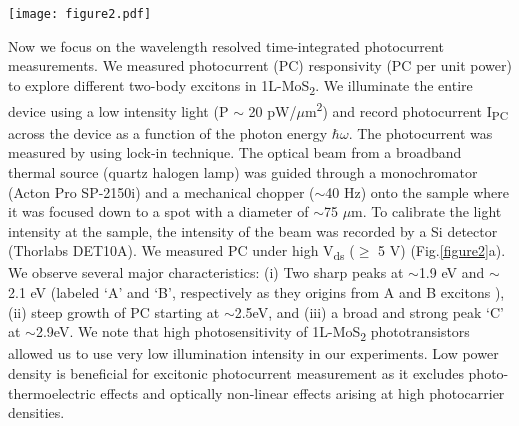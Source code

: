 \documentclass[%
 reprint,%
 amssymb, amsmath,%
 aip,cha,%
]{revtex4-1}
\begin{document}
\begin{figure*}[t]
\centering
\begin{minipage}{\textwidth}
\texttt{[image: figure2.pdf]}
\caption{(a) Photocurrent spectrum for different drain-source voltages; 5 V (blue), 7 V (red) and 9 V (black). Three peaks at 1.9 eV, 2 eV and 2.9 eV are identified as the A, B and C peaks. The sharp rise of PC at 2.5 is associated with the band edge transition, i.e., the direct transition between the valence maxima and the conduction band minima ($\sim$ E\textsubscript{g}). (b) The photocurrent with varying laser ($\lambda \sim$ 405 nm) excitation power measured for V\textsubscript{ds}=1 V. The dashed line is presenting the power law fitting (see text) \label{figure2}. 
}
\end{minipage}
\end{figure*}

Now we focus on the wavelength resolved time-integrated photocurrent measurements. We measured photocurrent (PC) responsivity (PC per unit power) to explore different two-body excitons in 1L-MoS\textsubscript{2}. We illuminate the entire device using a low intensity light (P $\sim$ 20 pW/$\mu$m\textsuperscript{2})  and record photocurrent I\textsubscript{PC} across the device as a function of the photon energy $\hbar\omega$. The photocurrent was measured by using lock-in technique. The optical beam from a broadband thermal source (quartz halogen lamp) was guided through a monochromator (Acton Pro SP-2150i) and a mechanical chopper ($\sim$40 Hz) onto the sample where it was focused down to a spot with a diameter of $\sim$75 $\mu$m. To calibrate the light intensity at the sample, the intensity of the beam was recorded by a Si detector (Thorlabs DET10A). We measured PC under high V\textsubscript{ds} ($\geqslant$ 5 V) (Fig.\ref{figure2}a). We observe several major characteristics: (i) Two sharp peaks at $\sim$1.9 eV and $\sim$2.1 eV (labeled `A' and `B', respectively as they origins from A and B excitons \cite{27}), (ii) steep growth of PC starting at $\sim$2.5eV, and (iii) a broad and strong peak `C' at $\sim$2.9eV. We note that high photosensitivity of 1L-MoS\textsubscript{2} phototransistors allowed us to use very low illumination intensity in our experiments. Low power density is beneficial for excitonic photocurrent measurement as it excludes photo-thermoelectric effects \cite{29}and optically non-linear \cite{30}effects arising at high photocarrier densities.
\end{document}
